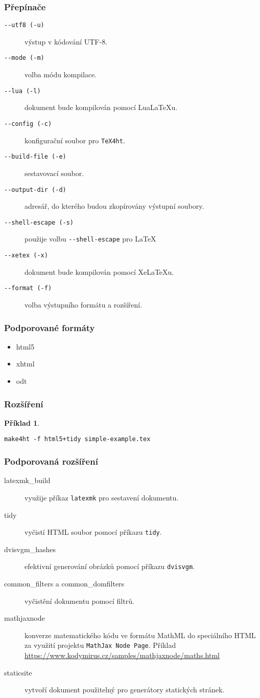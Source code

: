 \documentclass[czech]{beamer}
\newtheorem{priklad}{Příklad}
\newcommand\prepinac[1]{\texttt{-\/-#1}}
\begin{document}
\begin{frame}[fragile]
  \frametitle{Přepínače}
\begin{description}
  \item[\prepinac{utf8 (-u)}] výstup v kódování UTF-8.
  \item[\prepinac{mode (-m)}] volba módu kompilace.
  \item[\prepinac{lua (-l)}] dokument bude kompilován pomocí Lua\LaTeX u.
  \item[\prepinac{config (-c)}] konfigurační soubor pro \texttt{TeX4ht}. 
  \item[\prepinac{build-file (-e)}] sestavovací soubor.
  \item[\prepinac{output-dir (-d)}] adresář, do kterého budou zkopírovány výstupní soubory.
  \item[\prepinac{shell-escape (-s)}] použije volbu \verb|--shell-escape| pro \LaTeX
  \item[\prepinac{xetex (-x)}] dokument bude kompilován pomocí Xe\LaTeX u.
  \item[\prepinac{format (-f)}] volba výstupního formátu a rozšíření.
\end{description}

\end{frame}

\begin{frame}
  \frametitle{Podporované formáty}
  \begin{itemize}
    \item html5
    \item xhtml
    \item odt
  \end{itemize}
\end{frame}

\begin{frame}[fragile]
  \frametitle{Rozšíření}
  \begin{priklad}
\begin{verbatim}
make4ht -f html5+tidy simple-example.tex
\end{verbatim}
\end{priklad}
\end{frame}
\begin{frame}
  \frametitle{Podporovaná rozšíření}
\begin{description}
  \item[latexmk\_build] využije příkaz \texttt{latexmk} pro sestavení
    dokumentu.
  \item[tidy] vyčistí HTML soubor pomocí příkazu \texttt{tidy}.
  \item[dvisvgm\_hashes] efektivní generování obrázků pomocí příkazu
    \texttt{dvisvgm}. 
  \item[common\_filters a common\_domfilters] vyčistění dokumentu pomocí filtrů. 
  \item[mathjaxnode] konverze matematického kódu ve formátu MathML do
    speciálního HTML za využití projektu \texttt{MathJax Node
    Page}. Příklad \url{https://www.kodymirus.cz/samples/mathjaxnode/maths.html}
  \item[staticsite]  vytvoří dokument použitelný pro generátory statických
    stránek.
\end{description}
\end{frame}
\end{document}
